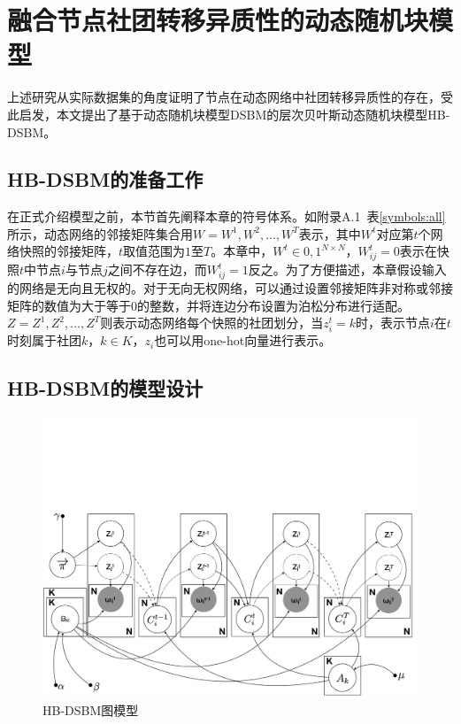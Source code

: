 \section{融合节点社团转移异质性的动态随机块模型}
上述研究从实际数据集的角度证明了节点在动态网络中社团转移异质性的存在，受此启发，本文提出了基于动态随机块模型DSBM的层次贝叶斯动态随机块模型HB-DSBM。

\subsection{HB-DSBM的准备工作}



在正式介绍模型之前，本节首先阐释本章的符号体系。如附录A.1~表\ref{symbols:all}所示，动态网络的邻接矩阵集合用$W={W^1, W^2, \dots, W^T}$表示，其中$W^t$对应第$t$个网络快照的邻接矩阵，$t$取值范围为$1$至$T$。本章中，$W^t \in {0,1}^{N \times N}$，$W_{ij}^t = 0$表示在快照$t$中节点$i$与节点$j$之间不存在边，而$W_{ij}^t = 1$反之。为了方便描述，本章假设输入的网络是无向且无权的。对于无向无权网络，可以通过设置邻接矩阵非对称或邻接矩阵的数值为大于等于$0$的整数，并将连边分布设置为泊松分布进行适配。$Z = {Z^1, Z^2, \dots, Z^T}$则表示动态网络每个快照的社团划分，当$z_i^t = k$时，表示节点$i$在$t$时刻属于社团$k$，$k \in K$，$z_i$也可以用one-hot向量进行表示。

\subsection{HB-DSBM的模型设计}

\begin{figure}[!htbp]
	\setlength{\abovecaptionskip}{0pt} 
	\setlength{\belowcaptionskip}{10pt} 
	\includegraphics[width=.9\textwidth]{figures/chap04/graph-model_v3_cuted.pdf}
	\caption{HB-DSBM图模型}
	\label{fig.4.1}
\end{figure}

